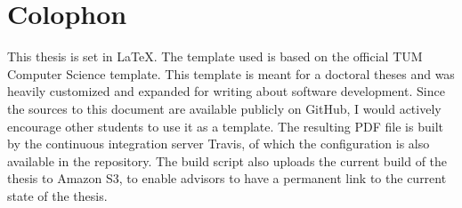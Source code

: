 

\chapter{Colophon}
\label{chapter:Colophon}
This thesis is set in \LaTeX \citep{latex}. The template used is based on the official TUM Computer Science template. This template is meant for a doctoral theses and was heavily customized and expanded for writing about software development. Since the sources to this document are available publicly on GitHub, I would actively encourage other students to use it as a template. The resulting PDF file is built by the continuous integration server Travis, of which the configuration is also available in the repository. The build script also uploads the current build of the thesis to Amazon S3, to enable advisors to have a permanent link to the current state of the thesis.